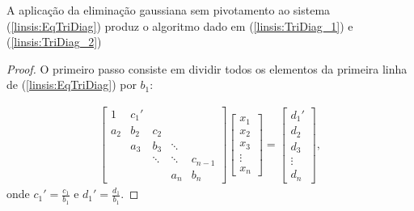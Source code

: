 \begin{teo} A aplicação da eliminação gaussiana sem pivotamento ao sistema (\ref{linsis:EqTriDiag}) produz o algoritmo dado em (\ref{linsis:TriDiag_1}) e (\ref{linsis:TriDiag_2})
\end{teo}
\begin{proof}
O primeiro passo consiste em dividir todos os elementos da primeira linha de (\ref{linsis:EqTriDiag}) por $b_1$:

\begin{eqnarray*} \begin{bmatrix}
   {1} & {c_1'} & {   } & {   } & {   } \\
   {a_2} & {b_2} & {c_2} & {   } & {   } \\
   {   } & {a_3} & {b_3} & \ddots & {   } \\
   {   } & {   } & \ddots & \ddots & {c_{n-1}}\\
   {   } & {   } & {   } & {a_n} & {b_n}
\end{bmatrix}
\begin{bmatrix}
   {x_1 }  \\
   {x_2 }  \\
   {x_3 }  \\
   \vdots   \\
   {x_n }  
\end{bmatrix}
=
\begin{bmatrix}
   {d_1' }  \\
   {d_2 }  \\
   {d_3 }  \\
   \vdots   \\
   {d_n }  
\end{bmatrix},
\end{eqnarray*}
onde $c_1'=\frac{c_1}{b_1}$ e $d_1'=\frac{d_1}{b_1}.$


\end{proof}
